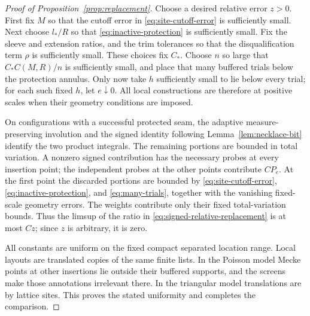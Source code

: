 \begin{proof}[Proof of Proposition~\ref{prop:replacement}]
Choose a desired relative error $z>0$.  First fix $M$ so that the cutoff
error in \eqref{eq:site-cutoff-error} is sufficiently small.  Next choose
$l_*/R$ so that \eqref{eq:inactive-protection} is sufficiently small.
Fix the sleeve and extension ratios, and the trim tolerances so that the
disqualification term $\rho$ is sufficiently small.  These choices fix
$C_*$.  Choose $n$ so large that $C_*C(M,R)/n$ is sufficiently small,
and place that many buffered trials below the protection annulus.
Only now take $h$ sufficiently small to lie below every trial; for each
such fixed $h$, let $e\downarrow0$.  All local constructions are therefore
at positive scales when their geometry conditions are imposed.

On configurations with a successful protected seam, the adaptive
measure-preserving involution and the signed identity following
Lemma~\ref{lem:necklace-bit} identify the two product integrals.
The remaining portions are bounded in total variation.  A nonzero
signed contribution has the necessary probes at every insertion point;
the independent probes at the other points contribute $C P_e$.  At the
first point the discarded portions are bounded by
\eqref{eq:site-cutoff-error}, \eqref{eq:inactive-protection}, and
\eqref{eq:many-trials}, together with the vanishing fixed-scale geometry
errors.  The weights contribute only their fixed total-variation bounds.
Thus the limsup of the ratio in
\eqref{eq:signed-relative-replacement} is at most $Cz$; since $z$ is
arbitrary, it is zero.

All constants are uniform on the fixed compact separated location range.
Local layouts are translated copies of the same finite lists.  In the
Poisson model Mecke points at other insertions lie outside their buffered
supports, and the screens make those annotations irrelevant there.  In
the triangular model translations are by lattice sites.  This proves
the stated uniformity and completes the comparison.
\end{proof}
